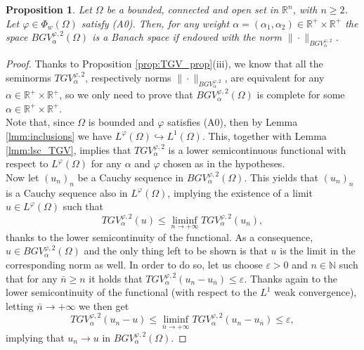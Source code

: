 \documentclass[a4paper,11pt,oneside,notitlepage]{article}
\newtheorem{proposition}[theorem]{Proposition}
\numberwithin{equation}{section}
\def\R{\mathbb{R}}
\def\N{\mathbb{N}}
\newcommand{\e}{\varepsilon}
\newcommand{\vphi}{\varphi}
\begin{document}
\begin{proposition}
    Let $\Omega$ be a bounded, connected and open set in $\R^n$, with $n \ge 2$. Let $\vphi \in \Phi_w(\Omega)$ satisfy (A0). Then, for any weight $\alpha = (\alpha_1, \alpha_2) \in \R^+ \times \R^+$ the space $BGV^{\vphi,2}_\alpha(\Omega)$ is a Banach space if endowed with the norm $\|\cdot\|_{BGV^{\vphi,2}_\alpha}$.
\end{proposition}
\begin{proof}
    Thanks to Proposition \ref{prop:TGV_prop}(iii), we know that all the seminorms $TGV^{\vphi,2}_\alpha$, respectively norms $\|\cdot\|_{BGV^{\vphi,2}_\alpha}$, are equivalent for any $\alpha \in \R^+ \times \R^+$, so we only need to prove that $BGV^{\vphi,2}_\alpha(\Omega)$ is complete for some $\alpha \in \R^+ \times \R^+$.
    \\
    Note that, since $\Omega$ is bounded and $\vphi$ satisfies (A0), then by Lemma \ref{lmm:inclusions} we have $L^\vphi(\Omega) \hookrightarrow L^1(\Omega)$. This, together with Lemma \ref{lmm:lsc_TGV}, implies that $TGV^{\vphi,2}_\alpha$ is a lower semicontinuous functional with respect to $L^\vphi(\Omega)$ for any $\alpha$ and $\vphi$ chosen as in the hypotheses.
    \\
    Now let $(u_n)_n$ be a Cauchy sequence in $BGV^{\vphi,2}_\alpha(\Omega)$. This yields that $(u_n)_n$ is a Cauchy sequence also in $L^\vphi(\Omega)$, implying the existence of a limit $u \in L^\vphi(\Omega)$ such that
    \begin{equation*}
        TGV^{\vphi,2}_\alpha(u) \le \liminf_{n \to +\infty} TGV^{\vphi,2}_\alpha(u_n),
    \end{equation*}
    thanks to the lower semicontinuity of the functional. As a consequence, $u \in BGV^{\vphi,2}_\alpha(\Omega)$ and the only thing left to be shown is that $u$ is the limit in the corresponding norm as well. In order to do so, let us choose $\e > 0$ and $n \in \N$ such that for any $\bar{n} \ge n$ it holds that $TGV^{\vphi,2}_\alpha(u_n - u_{\bar{n}}) \le \e$. Thanks again to the lower semicontinuity of the functional (with respect to the $L^1$ weak convergence), letting $\bar{n} \to +\infty$ we then get
    \begin{equation*}
        TGV^{\vphi,2}_\alpha(u_n - u) \le \liminf_{\bar{n} \to +\infty} TGV^{\vphi,2}_\alpha(u_n - u_{\bar{n}}) \le \e,
    \end{equation*}
    implying that $u_n \to u$ in $BGV^{\vphi,2}_\alpha(\Omega)$.
\end{proof}
\end{document}

